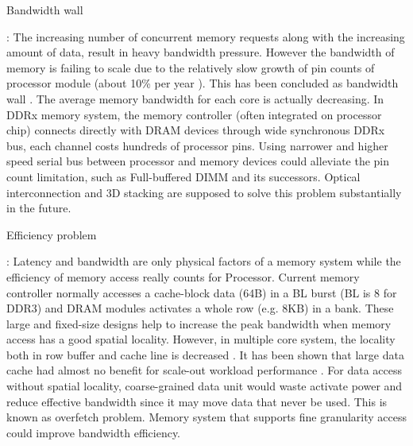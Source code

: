 \documentclass[pageno]{jpaper}
\begin{document}
\begin{bfseries}Bandwidth wall\end{bfseries}: The increasing number of concurrent memory requests along with the increasing amount of data, result in heavy bandwidth pressure. However the bandwidth of memory is failing to scale due to the relatively slow growth of pin counts of processor module (about 10\% per year \cite{ITRSRoadmap}). This has been concluded as bandwidth wall \cite{BandwidthWall}. The average memory bandwidth for each core is actually decreasing. In DDRx memory system, the memory controller (often integrated on processor chip) connects directly with DRAM devices through wide synchronous DDRx bus, each channel costs hundreds of processor pins.  Using narrower and higher speed serial bus between processor and memory devices could alleviate the pin count limitation, such as Full-buffered DIMM and its successors. Optical interconnection and 3D stacking are supposed to solve this problem substantially in the future.

\begin{bfseries}Efficiency problem\end{bfseries}: Latency and bandwidth are only physical factors of a memory system while the efficiency of memory access really counts for Processor. Current memory controller normally accesses a cache-block data (64B) in a BL burst (BL is 8 for DDR3) and DRAM modules activates a whole row (e.g. 8KB) in a bank. These large and fixed-size designs help to increase the peak bandwidth when memory access has a good spatial locality. However, in multiple core system, the locality both in row buffer and cache line is decreased \cite{RethinkDRAMArch,AGMS}. It has been shown that large data cache had almost no benefit for scale-out workload performance \cite{CloudSuite,ScaleOutProcessors}.
For data access without spatial locality, coarse-grained data unit would waste activate power and reduce effective bandwidth since it may move data that never be used. This is known as overfetch problem. Memory system that supports fine granularity access \cite{AGMS,DGMS} could improve bandwidth efficiency.
\end{document}
